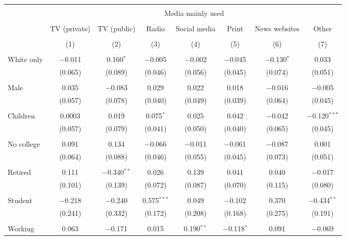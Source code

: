 
\begin{tabular}{@{\extracolsep{5pt}}lccccccc} 
\\[-1.8ex]\hline 
\hline \\[-1.8ex] 
 & \multicolumn{7}{c}{Media mainly used} \\ 
\cline{2-8} 
\\[-1.8ex] & TV (private) & TV (public) & Radio & Social media & Print & News websites & Other \\ 
\\[-1.8ex] & (1) & (2) & (3) & (4) & (5) & (6) & (7)\\ 
\hline \\[-1.8ex] 
 White only & $-$0.011 & 0.160$^{*}$ & $-$0.005 & $-$0.002 & $-$0.045 & $-$0.130$^{*}$ & 0.033 \\ 
  & (0.065) & (0.089) & (0.046) & (0.056) & (0.045) & (0.074) & (0.051) \\ 
  & & & & & & & \\ 
 Male & 0.035 & $-$0.083 & 0.029 & 0.022 & 0.018 & $-$0.016 & $-$0.005 \\ 
  & (0.057) & (0.078) & (0.040) & (0.049) & (0.039) & (0.064) & (0.045) \\ 
  & & & & & & & \\ 
 Children & 0.0003 & 0.019 & 0.075$^{*}$ & 0.025 & 0.042 & $-$0.042 & $-$0.120$^{***}$ \\ 
  & (0.057) & (0.079) & (0.041) & (0.050) & (0.040) & (0.065) & (0.045) \\ 
  & & & & & & & \\ 
 No college & 0.091 & 0.134 & $-$0.066 & $-$0.011 & $-$0.061 & $-$0.087 & 0.001 \\ 
  & (0.064) & (0.088) & (0.046) & (0.055) & (0.045) & (0.073) & (0.051) \\ 
  & & & & & & & \\ 
 Retired & 0.111 & $-$0.340$^{**}$ & 0.026 & 0.139 & 0.041 & 0.040 & $-$0.017 \\ 
  & (0.101) & (0.139) & (0.072) & (0.087) & (0.070) & (0.115) & (0.080) \\ 
  & & & & & & & \\ 
 Student & $-$0.218 & $-$0.240 & 0.575$^{***}$ & 0.049 & $-$0.102 & 0.370 & $-$0.434$^{**}$ \\ 
  & (0.241) & (0.332) & (0.172) & (0.208) & (0.168) & (0.275) & (0.191) \\ 
  & & & & & & & \\ 
 Working & 0.063 & $-$0.171 & 0.015 & 0.190$^{**}$ & $-$0.118$^{*}$ & 0.091 & $-$0.069 \\ 

\end{tabular}
